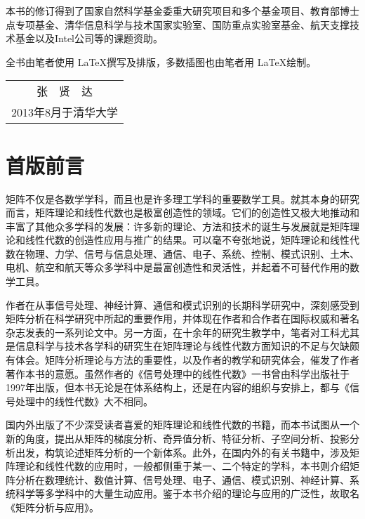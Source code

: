 \documentclass[punct=kaiming, fontset=sikou]{ctexbook}
\numberwithin{equation}{section}
\begin{document}
  本书的修订得到了国家自然科学基金委重大研究项目和多个基金项目、教育部博士点专项基金、清华信息科学与技术国家实验室、国防重点实验室基金、航天支撑技术基金以及Intel公司等的课题资助。

  全书由笔者使用 \LaTeX 撰写及排版，多数插图也由笔者用 \LaTeX 绘制。
  \begin{flushright}
    \fangsong
    \begin{tabular}{c@{}}
      张　贤　达\\
      {\small 2013年8月于清华大学}
    \end{tabular}\hspace*{2\ccwd}
  \end{flushright}

  \chapter{首版前言}
  矩阵不仅是各数学学科，而且也是许多理工学科的重要数学工具。就其本身的研究而言，矩阵理论和线性代数也是极富创造性的领域。它们的创造性又极大地推动和丰富了其他众多学科的发展：许多新的理论、方法和技术的诞生与发展就是矩阵理论和线性代数的创造性应用与推广的结果。可以毫不夸张地说，矩阵理论和线性代数在物理、力学、信号与信息处理、通信、电子、系统、控制、模式识别、土木、电机、航空和航天等众多学科中是最富创造性和灵活性，并起着不可替代作用的数学工具。

  作者在从事信号处理、神经计算、通信和模式识别的长期科学研究中，深刻感受到矩阵分析在科学研究中所起的重要作用，并体现在作者和合作者在国际权威和著名杂志发表的一系列论文中。另一方面，在十余年的研究生教学中，笔者对工科尤其是信息科学与技术各学科的研究生在矩阵理论与线性代数方面知识的不足与欠缺颇有体会。矩阵分析理论与方法的重要性，以及作者的教学和研究体会，催发了作者著作本书的意愿。虽然作者的《信号处理中的线性代数》一书曾由科学出版社于1997年出版，但本书无论是在体系结构上，还是在内容的组织与安排上，都与《信号处理中的线性代数》大不相同。

  国内外出版了不少深受读者喜爱的矩阵理论和线性代数的书籍，而本书试图从一个新的角度，提出从矩阵的梯度分析、奇异值分析、特征分析、子空间分析、投影分析出发，构筑论述矩阵分析的一个新体系。此外，在国内外的有关书籍中，涉及矩阵理论和线性代数的应用时，一般都侧重于某一、二个特定的学科，本书则介绍矩阵分析在数理统计、数值计算、信号处理、电子、通信、模式识别、神经计算、系统科学等多学科中的大量生动应用。鉴于本书介绍的理论与应用的广泛性，故取名《矩阵分析与应用》。
\end{document}
